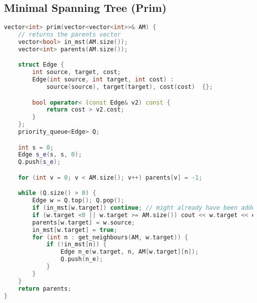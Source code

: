 \subsection{Minimal Spanning Tree (Prim)}
\begin{lstlisting}[language=C++]
vector<int> prim(vector<vector<int>>& AM) {
	// returns the parents vector
	vector<bool> in_mst(AM.size());
	vector<int> parents(AM.size());

	struct Edge	{
		int source, target, cost;
		Edge(int source, int target, int cost) :
			source(source), target(target), cost(cost)  {};

		bool operator< (const Edge& v2) const {
			return cost > v2.cost;
		}
	};
	priority_queue<Edge> Q;

	int s = 0;
	Edge s_e(s, s, 0);
	Q.push(s_e);

	for (int v = 0; v < AM.size(); v++) parents[v] = -1;

	while (Q.size() > 0) {
		Edge w = Q.top(); Q.pop();
		if (in_mst[w.target]) continue; // might already have been added
		if (w.target <0 || w.target >= AM.size()) cout << w.target << endl;
		parents[w.target] = w.source;
		in_mst[w.target] = true;
		for (int n : get_neighbours(AM, w.target)) {
			if (!in_mst[n]) {
				Edge n_e(w.target, n, AM[w.target][n]);
				Q.push(n_e);
			}
		}
	}
	return parents;
}
\end{lstlisting}